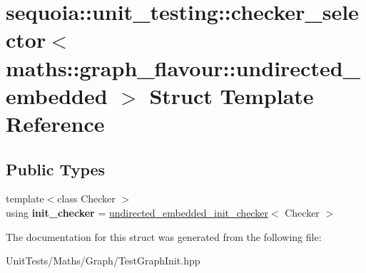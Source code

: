 \hypertarget{structsequoia_1_1unit__testing_1_1checker__selector_3_01maths_1_1graph__flavour_1_1undirected__embedded_01_4}{}\section{sequoia\+::unit\+\_\+testing\+::checker\+\_\+selector$<$ maths\+::graph\+\_\+flavour\+::undirected\+\_\+embedded $>$ Struct Template Reference}
\label{structsequoia_1_1unit__testing_1_1checker__selector_3_01maths_1_1graph__flavour_1_1undirected__embedded_01_4}
\subsection*{Public Types}
\begin{DoxyCompactItemize}
\item 
\mbox{\label{structsequoia_1_1unit__testing_1_1checker__selector_3_01maths_1_1graph__flavour_1_1undirected__embedded_01_4_a7165673533621425f3d5160b67e8ee36}} 
{\footnotesize template$<$class Checker $>$ }\\using {\bfseries init\+\_\+checker} = \mbox{\hyperlink{classsequoia_1_1unit__testing_1_1undirected__embedded__init__checker}{undirected\+\_\+embedded\+\_\+init\+\_\+checker}}$<$ Checker $>$
\end{DoxyCompactItemize}


The documentation for this struct was generated from the following file\+:\begin{DoxyCompactItemize}
\item 
Unit\+Tests/\+Maths/\+Graph/Test\+Graph\+Init.\+hpp\end{DoxyCompactItemize}
